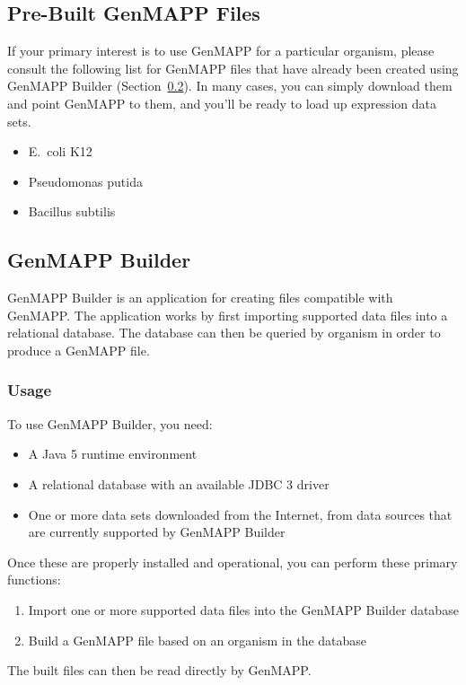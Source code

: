 \documentclass[11pt]{article}
\begin{document}
\subsection{Pre-Built GenMAPP Files}

If your primary interest is to use GenMAPP for a particular organism, please consult the following list for GenMAPP files that have already been created using GenMAPP Builder (Section~\ref{genmappBuilder}).  In many cases, you can simply download them and point GenMAPP to them, and you'll be ready to load up expression data sets.

\begin{itemize}
\item E.\ coli K12
\item Pseudomonas putida
\item Bacillus subtilis
\end{itemize}

\subsection{GenMAPP Builder}
\label{genmappBuilder}

GenMAPP Builder is an application for creating files compatible with GenMAPP.  The application works by first importing supported data files into a relational database.  The database can then be queried by organism in order to produce a GenMAPP file.

\subsubsection{Usage}

To use GenMAPP Builder, you need:
\begin{itemize}
\item A Java 5 runtime environment
\item A relational database with an available JDBC 3 driver
\item One or more data sets downloaded from the Internet, from data sources that are currently supported by GenMAPP Builder
\end{itemize}
Once these are properly installed and operational, you can perform these primary functions:
\begin{enumerate}
\item Import one or more supported data files into the GenMAPP Builder database
\item Build a GenMAPP file based on an organism in the database
\end{enumerate}
The built files can then be read directly by GenMAPP.
\end{document}

